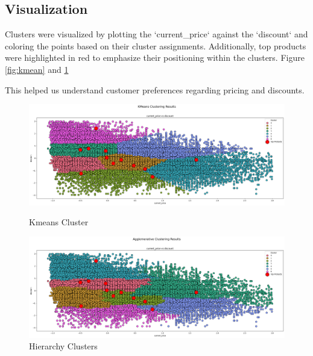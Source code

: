 \documentclass[a4paper,11pt]{article}
\begin{document}
\subsection{Visualization}

Clusters were visualized by plotting the `current\_price` against the `discount` and coloring the points based on their cluster assignments. Additionally, top products were highlighted in red to emphasize their positioning within the clusters. Figure \ref{fig:kmean} and \ref{fig:algo}

This helped us understand customer preferences regarding pricing and discounts.

\begin{figure}[h!]
    \centering
    \begin{minipage}{\textwidth}
        \centering
        \includegraphics[width=\textwidth]{kmeans.png}
        \caption{Kmeans Cluster}
        \label{fig:kmean}
    \end{minipage}
    \hfill
    \begin{minipage}{\textwidth}
        \centering
        \includegraphics[width=\textwidth]{algo.png}
        \caption{Hierarchy Clusters}
        \label{fig:algo}
    \end{minipage}
\end{figure}
\end{document}

